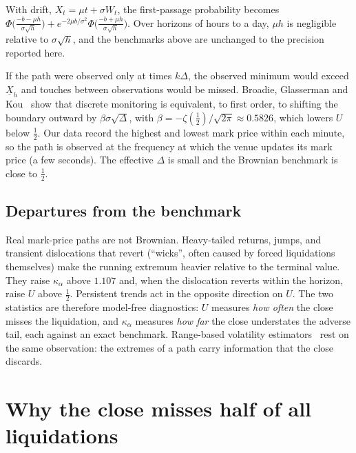 \begin{remark}[Drift]
With drift, $X_t=\mu t+\sigma W_t$, the first-passage probability becomes
$\Phi\big(\tfrac{-b-\mu h}{\sigma\sqrt h}\big)+e^{-2\mu b/\sigma^2}\Phi\big(\tfrac{-b+\mu h}{\sigma\sqrt h}\big)$.
Over horizons of hours to a day, $\mu h$ is negligible relative to $\sigma\sqrt h$, and the
benchmarks above are unchanged to the precision reported here.
\end{remark}

\begin{remark}
If the path were observed only at times $k\Delta$, the observed minimum would exceed
$\underline{X}_h$ and touches between observations would be missed. Broadie, Glasserman and
Kou~\cite{bgk} show that discrete monitoring is equivalent, to first order, to shifting the boundary
outward by $\beta\sigma\sqrt\Delta$, with $\beta=-\zeta(\tfrac12)/\sqrt{2\pi}\approx0.5826$, which
lowers $U$ below $\tfrac12$. Our data record the highest and lowest mark price within each minute, so
the path is observed at the frequency at which the venue updates its mark price (a few seconds). The
effective $\Delta$ is small and the Brownian benchmark is close to $\tfrac12$.
\end{remark}

\subsection{Departures from the benchmark}

Real mark-price paths are not Brownian. Heavy-tailed returns, jumps, and transient dislocations that
revert (``wicks'', often caused by forced liquidations themselves) make the running extremum heavier
relative to the terminal value. They raise $\kappa_\alpha$ above $1.107$ and, when the dislocation
reverts within the horizon, raise $U$ above $\tfrac12$. Persistent trends act in the opposite
direction on $U$. The two statistics are therefore model-free diagnostics: $U$ measures \emph{how
often} the close misses the liquidation, and $\kappa_\alpha$ measures \emph{how far} the close
understates the adverse tail, each against an exact benchmark. Range-based volatility
estimators~\cite{parkinson,garmanklass,rogerssatchell} rest on the same observation: the extremes of
a path carry information that the close discards.
\else
\section{Why the close misses half of all liquidations}
\label{sec:framework}

